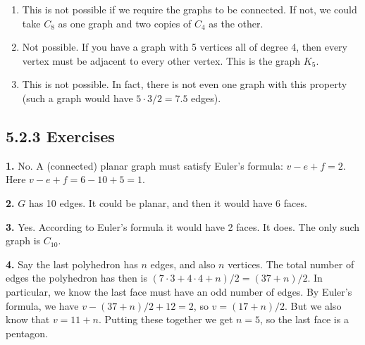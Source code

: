 \documentclass[10pt,]{book}
\theoremstyle{plain}
\theoremstyle{definition}
\theoremstyle{definition}
\theoremstyle{definition}
\numberwithin{equation}{chapter}
\begin{document}
\begin{enumerate}[label=(\alph*)]
%
\item\hypertarget{li-1207}{}
This is not possible if we require the graphs to be connected.  If not, we could take \(C_8\) as one graph and two copies of \(C_4\) as the other.
%
\item\hypertarget{li-1208}{}
Not possible.  If you have a graph with 5 vertices all of degree 4, then every vertex must be adjacent to every other vertex.  This is the graph \(K_5\).
%
\item\hypertarget{li-1209}{}
This is not possible.  In fact, there is not even one graph with this property (such a graph would have \(5\cdot 3/2 = 7.5\) edges).
%
\end{enumerate}
\par\smallskip
\subsection*{5.2.3 Exercises}
\noindent\textbf{1.}\quad{}
No. A (connected) planar graph must satisfy Euler's formula: \(v - e + f = 2\). Here \(v - e + f = 6 - 10 + 5 = 1\).
%
\par\smallskip
\noindent\textbf{2.}\quad{}
\(G\) has 10 edges. It could be planar, and then it would have 6 faces.
%
\par\smallskip
\noindent\textbf{3.}\quad{}
Yes. According to Euler's formula it would have 2 faces. It does. The only such graph is \(C_{10}\).
%
\par\smallskip
\noindent\textbf{4.}\quad{}
Say the last polyhedron has \(n\) edges, and also \(n\) vertices. The total number of edges the polyhedron has then is \((7 \cdot 3 + 4 \cdot 4 + n)/2 = (37 + n)/2\). In particular, we know the last face must have an odd number of edges. By Euler's formula, we have \(v - (37+n)/2 + 12 = 2\), so \(v = (17 + n)/2\). But we also know that \(v = 11 + n\). Putting these together we get \(n = 5\), so the last face is a pentagon.
%
\par\smallskip
\end{document}
